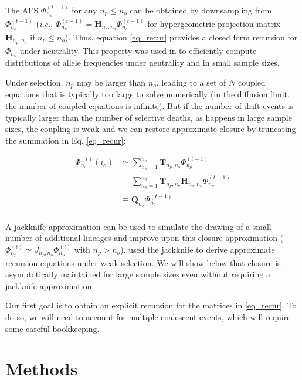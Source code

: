 \documentclass[review]{elsarticle}
\newcommand{\afs}[2]{\Phi_{#1}^{(#2)}}
\begin{document}
The AFS  $\afs{n_p}{t-1}$ for any  $n_p\leq n_o$ can be obtained by downsampling from $\afs{n_o}{t-1}$ (\textit{i.e.}, $\afs{n_p}{t-1} =
\mathbf{H}_{n_p,n_o} \afs{n_o}{t-1}$ for hypergeometric projection matrix $\mathbf{H}_{n_p,n_o}$ if
$n_p\leq n_o$). Thus, equation \eqref{eq_recur} provides a closed form recursion for $\Phi_{n_o}$ under neutrality.
This property was used in \cite{JouganousEtAl2017} to efficiently compute distributions of allele
frequencies under neutrality and in small sample sizes.

Under selection, $n_{p}$ may be larger than $n_o$, leading to a set of $N$ coupled equations that is
typically too large to solve numerically (in the diffusion limit, the number of coupled equations is
infinite). But if the number of drift events is typically larger than the number of selective
deaths, as happens in large sample sizes, the coupling is weak and we can restore approximate
closure by truncating the summation in Eq. \ref{eq_recur}:

\begin{equation}
\begin{split}
  \afs{n_o}{t}(i_o)
  &\simeq \sum_{n_p=1}^{n_{o}} \mathbf{T}_{n_p,n_o}                      \afs{n_p}{t-1}\\
  &=      \sum_{n_p=1}^{n_{o}} \mathbf{T}_{n_p,n_o} \mathbf{H}_{n_p,n_o} \afs{n_o}{t-1}\\
  &\equiv \mathbf{Q}_{n_o}                                               \afs{n_o}{t-1}\\
\end{split}
\label{eq_truncated}
\end{equation}

A jackknife approximation \citep{Gravel2016} can be used to simulate the drawing of a small number
of additional lineages and improve upon this closure approximation
($\afs{n_p}{t} \simeq J_{n_p,n_o} \afs{n_o}{t}$ with $n_p>n_o$). \cite{JouganousEtAl2017} used the
jackknife to derive approximate recursion equations under weak selection. We will show below that
closure is asymptotically maintained for large sample sizes even without requiring a jackknife
approximation.

Our first goal is to obtain an explicit recursion for the matrices in \eqref{eq_recur}. To do so, we
will need to account for multiple coalescent events, which will require some careful bookkeeping.

\section{Methods}
\label{sec_methods}
\end{document}
